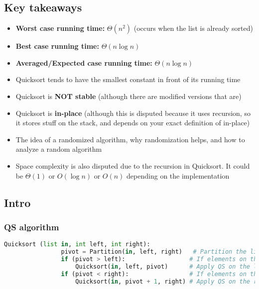 \subsection{Key takeaways}
\begin{intuition}
    \begin{itemize}
        \item \textbf{Worst case running time:} $\Theta(n^2)$ (occurs when the list is already sorted)
        \item \textbf{Best case running time:} $\Theta(n \log n)$
        \item \textbf{Averaged/Expected case running time:} $\Theta(n \log n)$
        \item Quicksort tends to have the smallest constant in front of its running time
        \item Quicksort is \textbf{NOT stable} (although there are modified versions that are)
        \item Quicksort is \textbf{in-place} (although this is disputed because it uses recursion, so it stores stuff on the stack, and depends on your exact definition of in-place)
        \item The idea of a randomized algorithm, why randomization helps, and how to analyze a random algorithm
        \item Space complexity is also disputed due to the recursion in Quicksort. It could be $\Theta(1)$ or $O(\log n)$ or $O(n)$ depending on the implementation
    \end{itemize}    
\end{intuition}

\subsection{Intro}
    \subsubsection{QS algorithm}
    \begin{definition}
        \begin{lstlisting}[language=Python, caption={Quicksort Algorithm Pseudocode with Comments}]
            Quicksort (list in, int left, int right):
                pivot = Partition(in, left, right)   # Partition the list and return the pivot 
                if (pivot > left):                  # If elements on the LS of pivot
                    Quicksort(in, left, pivot)      # Apply QS on the left partition
                if (pivot < right):                 # If elements on the RS of pivot
                    Quicksort(in, pivot + 1, right) # Apply QS on the right partition
        \end{lstlisting}
    \end{definition}


